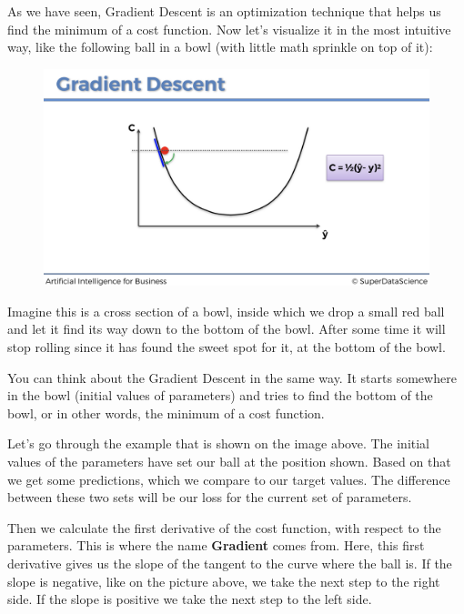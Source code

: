 \documentclass[]{book}
\begin{document}
As we have seen, Gradient Descent is an optimization technique that helps us find the minimum of a cost function. Now let's visualize it in the most intuitive way, like the following ball in a bowl (with little math sprinkle on top of it):

\begin{figure}[!htbp]
        \begin{center}
            \includegraphics[scale=0.18]{ANN_20.png}
        \end{center}
\end{figure}

Imagine this is a cross section of a bowl, inside which we drop a small red ball and let it find its way down to the bottom of the bowl. After some time it will stop rolling since it has found the sweet spot for it, at the bottom of the bowl.

You can think about the Gradient Descent in the same way. It starts somewhere in the bowl (initial values of parameters) and tries to find the bottom of the bowl, or in other words, the minimum of a cost function.

Let's go through the example that is shown on the image above. The initial values of the parameters have set our ball at the position shown. Based on that we get some predictions, which we compare to our target values. The difference between these two sets will be our loss for the current set of parameters.

Then we calculate the first derivative of the cost function, with respect to the parameters. This is where the name \textbf{Gradient} comes from. Here, this first derivative gives us the slope of the tangent to the curve where the ball is. If the slope is negative, like on the picture above, we take the next step to the right side. If the slope is positive we take the next step to the left side.
\end{document}

